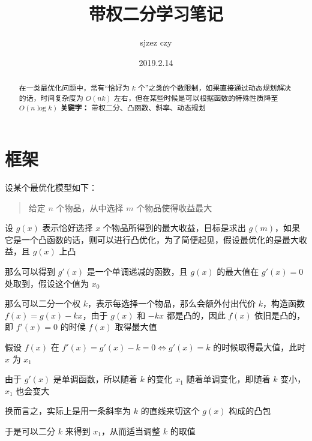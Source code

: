\documentclass[UTF8]{article}
\author {sjzez czy}
\title {带权二分学习笔记}
\date{2019.2.14}
\begin{document}
\maketitle

\begin{abstract}
    在一类最优化问题中，常有“恰好为 $k$ 个”之类的个数限制，如果直接通过动态规划解决的话，时间复杂度为 $O(nk)$ 左右，但在某些时候是可以根据函数的特殊性质降至 $O(n \log k)$
    \newline
    \centering
    \textbf{关键字：} 带权二分、凸函数、斜率、动态规划
\end{abstract}

\tableofcontents

\newpage

\section{框架}

设某个最优化模型如下：

\begin{quotation}

给定 $n$ 个物品，从中选择 $m$ 个物品使得收益最大

\end{quotation}

设 $g(x)$ 表示恰好选择 $x$ 个物品所得到的最大收益，目标是求出 $g(m)$，如果它是一个凸函数的话，则可以进行凸优化，为了简便起见，假设最优化的是最大收益，且 $g(x)$ 上凸

那么可以得到 $g'(x)$ 是一个单调递减的函数，且 $g(x)$ 的最大值在 $g'(x)=0$ 处取到，假设这个值为 $x_0$

那么可以二分一个权 $k$，表示每选择一个物品，那么会额外付出代价 $k$，构造函数 $f(x)=g(x)-kx$，由于 $g(x)$ 和 $-kx$ 都是凸的，因此 $f(x)$ 依旧是凸的，即 $f'(x)=0$ 的时候 $f(x)$ 取得最大值

假设 $f(x)$ 在 $f'(x)=g'(x)-k=0 \Leftrightarrow g'(x)=k$ 的时候取得最大值，此时 $x$ 为 $x_1$

由于 $g'(x)$ 是单调函数，所以随着 $k$ 的变化 $x_1$ 随着单调变化，即随着 $k$ 变小，$x_1$ 也会变大

换而言之，实际上是用一条斜率为 $k$ 的直线来切这个 $g(x)$ 构成的凸包

于是可以二分 $k$ 来得到 $x_1$，从而适当调整 $k$ 的取值
\end{document}
